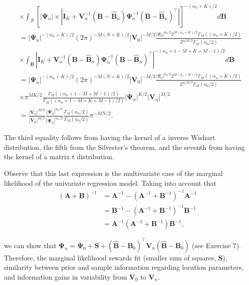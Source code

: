 \begin{align*}
	&\times \int_{\mathcal{B}}\left[|{\bm{\Psi}}_n|\times |{\bm{I}}_{K}+{\bm{V}}_n^{-1}({\bm{B}}-\widehat{\bm{B}}_n){\bm{\Psi}}_n^{-1}({\bm{B}}-\widehat{\bm{B}}_n)^{\top}|\right]^{-(\alpha_n+K)/2}d{\bm{B}}\\
	&=|{\bm{\Psi}}_n|^{-(\alpha_n+K)/2}(2\pi)^{-M(N+K)/2}\left|{\bm V}_0\right|^{-M/2}\frac{|\Psi_0|^{\alpha_0/2}2^{M(\alpha_n+K)/2}\Gamma_M((\alpha_n+K)/2)}{2^{\alpha_0M/2}\Gamma_M(\alpha_0/2)}\\
	&\times \int_{\mathcal{{\bm{B}}}}\left| {\bm{I}}_{K}+{\bm{V}}_n^{-1}({\bm{B}}-\widehat{\bm{B}}_n){\bm{\Psi}}_n^{-1}({\bm{B}}-\widehat{\bm{B}}_n)^{\top}\right|^{-(\alpha_n+1-M+K+M-1)/2}d{\bm{B}}\\
	&=|{\bm{\Psi}}_n|^{-(\alpha_n+K)/2}(2\pi)^{-M(N+K)/2}\left|{\bm V}_0\right|^{-M/2}\frac{|\Psi_0|^{\alpha_0/2}2^{M(\alpha_n+K)/2}\Gamma_M((\alpha_n+K)/2)}{2^{\alpha_0M/2}\Gamma_M(\alpha_0/2)}\\
	&\times \pi^{MK/2}\frac{\Gamma_M((\alpha_n+1-M+M-1)/2)}{\Gamma_M((\alpha_n+1-M+K+M-1)/2)}|{\bm{\Psi}}_n|^{K/2}|{\bm{V}}_n|^{M/2}\\
	&=\frac{|{\bm{V}}_n|^{M/2}}{|{\bm{V}}_0|^{M/2}}\frac{|{\bm{\Psi}}_0|^{\alpha_0/2}}{|{\bm{\Psi}}_n|^{\alpha_n/2}}\frac{\Gamma_M(\alpha_n/2)}{\Gamma_M(\alpha_0/2)}\pi^{-MN/2}.  
\end{align*}

The third equality follows from having the kernel of a inverse Wishart distribution, the fifth from the Silvester's theorem, and the seventh from having the kernel of a matrix t distribution.

Observe that this last expression is the multivariate case of the marginal likelihood of the univariate regression model. Taking into account that 
\begin{align*}
	({\bm{A}}+{\bm{B}})^{-1}&={\bm{A}}^{-1}-({\bm{A}}^{-1}+{\bm{B}}^{-1})^{-1}{\bm{A}}^{-1}\\
	&={\bm{B}}^{-1}-({\bm{A}}^{-1}+{\bm{B}}^{-1})^{-1}{\bm{B}}^{-1}\\
	&={\bm{A}}^{-1}({\bm{A}}^{-1}+{\bm{B}}^{-1}){\bm{B}}^{-1},
\end{align*} 

we can show that ${\bm{\Psi}}_{n}={\bm{\Psi}}_{0}+{\bm{S}}+(\hat{\bm{B}}-{\bm{B}}_{0})^{\top}{\bm{V}}_{n}(\hat{\bm{B}}-{\bm{B}}_{0})$ (see Exercise 7). Therefore, the marginal likelihood rewards fit (smaller sum of squares, ${\bm{S}}$), similarity between prior and sample information regarding location parameters, and information gains in variability from ${\bm{V}}_0$ to ${\bm{V}}_n$.   


